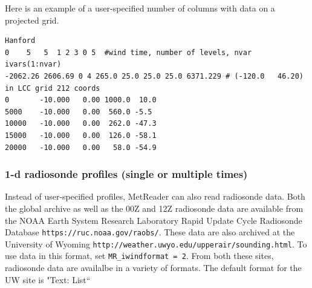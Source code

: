 \documentclass[11pt]{article}   %
\begin{document}
Here is an example of a user-specified number of columns with data on a 
projected grid.
\begin{verbatim}
Hanford
0    5   5  1 2 3 0 5  #wind time, number of levels, nvar ivars(1:nvar)
-2062.26 2606.69 0 4 265.0 25.0 25.0 25.0 6371.229 # (-120.0   46.20) in LCC grid 212 coords
0       -10.000   0.00 1000.0  10.0
5000    -10.000   0.00  560.0 -5.5
10000   -10.000   0.00  262.0 -47.3
15000   -10.000   0.00  126.0 -58.1
20000   -10.000   0.00   58.0 -54.9
\end{verbatim}


\subsubsection{1-d radiosonde profiles (single or multiple times)}
Instead of user-specified profiles, MetReader can also read radiosonde data.
Both the global archive as well as the 00Z and 12Z radiosonde data are
available from the NOAA Earth System Research Laboratory Rapid Update Cycle
Radiosonde Database \texttt{https://ruc.noaa.gov/raobs/}.  These data
are also archived at the University of Wyoming
\texttt{http://weather.uwyo.edu/upperair/sounding.html}.
To use data in this format, set \texttt{MR\_iwindformat = 2}.
From both these sites, radiosonde data are availalbe in a variety of formats.
The default format for the UW site is "Text: List``
\end{document}
